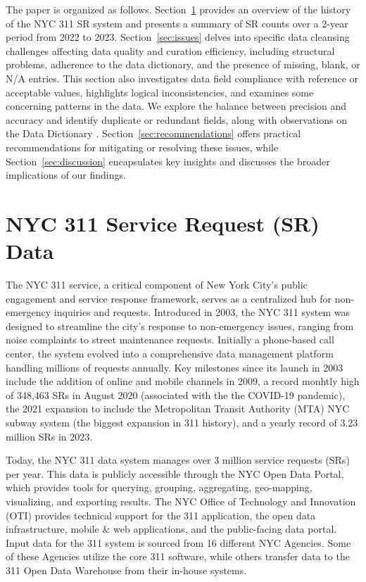 \documentclass[linenumber]{jdsart}
\begin{document}
The paper is organized as follows. Section~\ref{sec:data} provides 
an overview of the history of the NYC 311 SR system and presents 
a summary of SR counts over a 2-year period from 2022 to 2023. 
Section~\ref{sec:issues} delves into specific data cleansing 
challenges affecting data quality and curation efficiency, 
including structural problems, adherence to the data dictionary, 
and the presence of missing, blank, or N/A entries. This section
 also investigates data field compliance with reference or acceptable values, 
highlights logical inconsistencies, and examines some concerning patterns 
in the data. We explore the balance between precision and accuracy 
and identify duplicate or redundant fields, along with observations 
on the Data Dictionary \citep{datadictionaryNYC}.
Section~\ref{sec:recommendations} offers 
practical recommendations for mitigating or resolving these issues, 
while Section~\ref{sec:discussion} encapsulates key insights and 
discusses the broader implications of our findings.


\section{NYC 311 Service Request (SR) Data} 
\label{sec:data}

The NYC 311 service, a critical component of New York City's public
engagement and service response framework, serves as a centralized hub
for non-emergency inquiries and requests. Introduced in 2003, the NYC
311 system was designed to streamline the city's response to
non-emergency issues, ranging from noise complaints to street
maintenance requests. Initially a phone-based call center, the system
evolved into a comprehensive data management platform handling
millions of requests annually. Key milestones since its launch in 2003
include the addition of online and mobile channels in 2009, a
record monhtly high of 348,463 SRs in 
August 2020 (associated with the the COVID-19 
pandemic), the 2021 expansion to include the 
Metropolitan Transit Authority (MTA) NYC subway 
system (the biggest expansion in 311 history), 
and a yearly record of 3.23 million SRs in 2023.


Today, the NYC 311 data system manages over 3 million service
requests (SRs) per year. This data is publicly accessible 
through the NYC Open Data Portal, which provides 
tools for querying, grouping, aggregating,
geo-mapping, visualizing, and exporting results. The
NYC Office of Technology and Innovation (OTI) provides technical support for 
the 311 application, the open data infrastructure, mobile \& web applications, 
and the public-facing data portal. Input data for the 311 system 
is sourced from 16 different NYC Agencies. Some of these Agencies
utilize the core 311 software, while others transfer data to the
311 Open Data Warehouse from their in-house systems.
\end{document}
